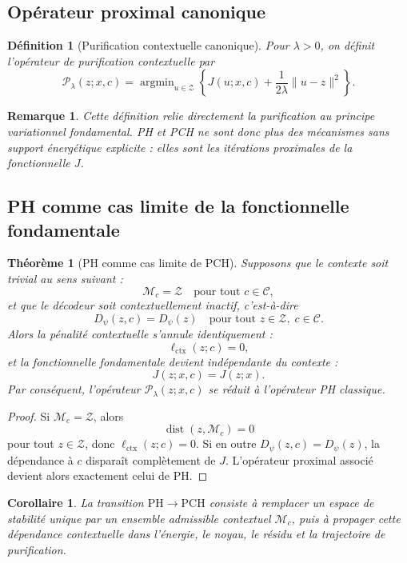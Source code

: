 \documentclass[11pt,a4paper]{article}
\newtheorem{definition}{Définition}[section]
\newtheorem{theorem}{Théorème}[section]
\newtheorem{corollary}{Corollaire}[section]
\newtheorem{remark}{Remarque}[section]
\DeclareMathOperator{\argmin}{argmin}
\DeclareMathOperator{\dist}{dist}
\newcommand{\C}{\mathcal C}
\newcommand{\Z}{\mathcal Z}
\newcommand{\Pcal}{\mathcal P}
\newcommand{\1}{\mathbf 1}
\begin{document}
\subsection{Opérateur proximal canonique}

\begin{definition}[Purification contextuelle canonique]
Pour \(\lambda>0\), on définit l'opérateur de purification contextuelle par
\[
\Pcal_{\lambda}(z;x,c)
=
\argmin_{u\in\Z}
\left\{
J(u;x,c)
+
\frac{1}{2\lambda}\|u-z\|^2
\right\}.
\]
\end{definition}

\begin{remark}
Cette définition relie directement la purification au principe variationnel fondamental.
PH et PCH ne sont donc plus des mécanismes sans support énergétique explicite :
elles sont les itérations proximales de la fonctionnelle \(J\).
\end{remark}

\subsection{PH comme cas limite de la fonctionnelle fondamentale}

\begin{theorem}[PH comme cas limite de PCH]
Supposons que le contexte soit trivial au sens suivant :
\[
\mathcal M_c = \Z
\quad\text{pour tout } c\in\C,
\]
et que le décodeur soit contextuellement inactif, c'est-à-dire
\[
D_\psi(z,c)=D_\psi(z)
\quad\text{pour tout } z\in\Z,\; c\in\C.
\]
Alors la pénalité contextuelle s'annule identiquement :
\[
\ell_{\mathrm{ctx}}(z;c)=0,
\]
et la fonctionnelle fondamentale devient indépendante du contexte :
\[
J(z;x,c)=J(z;x).
\]
Par conséquent, l'opérateur \(\Pcal_{\lambda}(z;x,c)\) se réduit à l'opérateur PH classique.
\end{theorem}

\begin{proof}
Si \(\mathcal M_c=\Z\), alors
\[
\dist(z,\mathcal M_c)=0
\]
pour tout \(z\in\Z\), donc \(\ell_{\mathrm{ctx}}(z;c)=0\).
Si en outre \(D_\psi(z,c)=D_\psi(z)\), la dépendance à \(c\) disparaît complètement de \(J\).
L'opérateur proximal associé devient alors exactement celui de PH.
\end{proof}

\begin{corollary}
La transition \(\mathrm{PH}\to\mathrm{PCH}\) consiste à remplacer un espace de stabilité unique par un ensemble admissible contextuel \(\mathcal M_c\), puis à propager cette dépendance contextuelle dans l'énergie, le noyau, le résidu et la trajectoire de purification.
\end{corollary}
\end{document}
